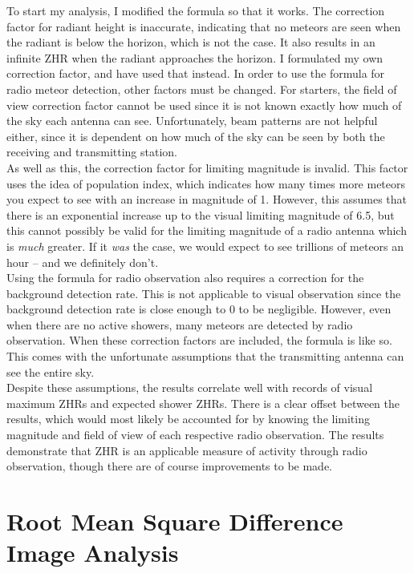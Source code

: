 \documentclass[12pt]{article}
\begin{document}
{{To start my analysis, I modified the formula so that it works. The correction
factor for radiant height is inaccurate, indicating that no meteors are seen
when the radiant is below the horizon, which is not the case. It also results in
an infinite ZHR when the radiant approaches the horizon. I formulated my own
correction factor, and have used that instead. In order to use the formula for
radio meteor detection, other factors must be changed. For starters, the field
of view correction factor cannot be used since it is not known exactly how much
of the sky each antenna can see. Unfortunately, beam patterns are not helpful
either, since it is dependent on how much of the sky can be seen by both the
receiving and transmitting station.\\

As well as this, the correction factor for limiting magnitude is invalid. This
factor uses the idea of population index, which indicates how many times more
meteors you expect to see with an increase in magnitude of 1. However, this
assumes that there is an exponential increase up to the visual limiting
magnitude of 6.5, but this cannot possibly be valid for the limiting magnitude
of a radio antenna which is {\it much} greater. If it {\it was} the case, we
would expect to see trillions of meteors an hour -- and we definitely don't.\\

Using the formula for radio observation also requires a correction for the
background detection rate. This is not applicable to visual observation since
the background detection rate is close enough to 0 to be negligible. However,
even when there are no active showers, many meteors are detected by radio
observation. When these correction factors are included, the formula is like so.
This comes with the unfortunate assumptions that the transmitting antenna can
see the entire sky.\\

Despite these assumptions, the results correlate well with records of visual
maximum ZHRs and expected shower ZHRs. There is a clear offset between the
results, which would most likely be accounted for by knowing the limiting
magnitude and field of view of each respective radio observation. The results
demonstrate that ZHR is an applicable measure of activity through radio
observation, though there are of course improvements to be made.\\
}

\section{Root Mean Square Difference Image Analysis}

}
\end{document}
